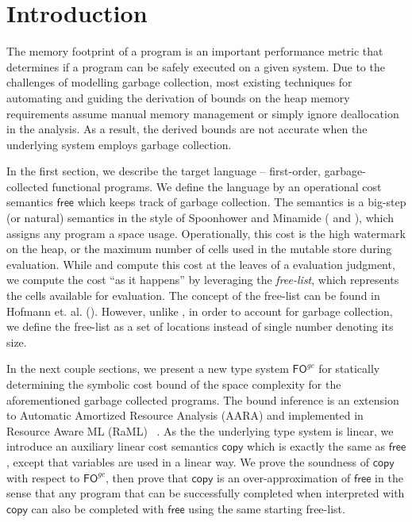 \documentclass{easychair}
\newcommand{\ms}[1]{\ensuremath{\mathsf{#1}}}
\newcommand{\fogc}{\ms{FO}^{gc}}
\theoremstyle{definition}
\begin{document}
\section{Introduction}
\label{sect:introduction}
The memory footprint of a program is an important performance metric
that determines if a program can be safely executed on a given
system. Due to the challenges of modelling garbage collection,
most existing techniques for
automating and guiding the derivation of bounds on the heap memory
requirements assume manual memory management or simply ignore
deallocation in the analysis. As a result, the derived bounds
are not accurate when the underlying system employs garbage
collection.

In the first section, we describe the target language --
first-order, garbage-collected functional programs.
We define the language by an operational cost semantics $\ms{free}$ 
which keeps track of garbage collection. The semantics is a big-step
(or natural) semantics in the style of Spoonhower and Minamide (\cite{Spoonhower:2008:SPP:1411204.1411240} and 
\cite{DBLP:journals/entcs/Minamide99}), which assigns any program a space usage. 
Operationally, this cost is
the high watermark on the heap, or the maximum number of cells used in the mutable store during 
evaluation. While \cite{Spoonhower:2008:SPP:1411204.1411240} and 
\cite{DBLP:journals/entcs/Minamide99} compute this cost at the leaves of a 
evaluation judgment, we compute the cost ``as it happens'' by leveraging the \emph{free-list},
which represents the cells available for evaluation. 
The concept of the free-list can be found in Hofmann et. al. (\cite{Hofmann:2003:SPH:604131.604148}).
However, unlike \cite{Hofmann:2003:SPH:604131.604148}, in order to account for garbage collection,
we define the free-list as a set of locations instead of single number denoting its size.

In the next couple sections, we present a new type system $\fogc$
for statically determining the symbolic cost bound 
of the space complexity for the aforementioned garbage collected programs.
The bound inference is an extension to Automatic Amortized Resource Analysis (AARA) 
and implemented in Resource Aware ML (RaML) ~\cite{Hoffmann:2017:TAR:3009837.3009842}. 
As the the underlying type system is linear, we introduce an auxiliary linear cost semantics 
$\ms{copy}$ which is exactly the same as $\ms{free}$, except that variables are used in 
a linear way. We prove the soundness of $\ms{copy}$ with respect to $\fogc$, then prove that
$\ms{copy}$ is an over-approximation of $\ms{free}$ in the sense that any program that can be 
successfully completed when interpreted with $\ms{copy}$ can also be completed with $\ms{free}$ 
using the same starting free-list.
\end{document}
